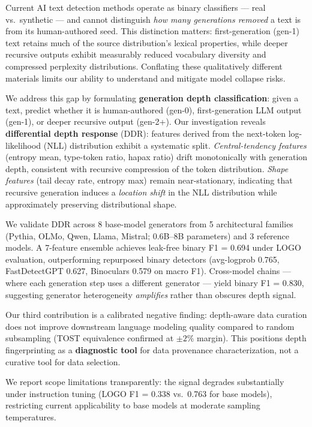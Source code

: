 \documentclass[11pt,twocolumn]{article}
\begin{document}
Current AI text detection methods operate as binary classifiers --- real vs.\ synthetic --- and cannot distinguish \emph{how many generations removed} a text is from its human-authored seed.
This distinction matters: first-generation (gen-1) text retains much of the source distribution's lexical properties, while deeper recursive outputs exhibit measurably reduced vocabulary diversity and compressed perplexity distributions.
Conflating these qualitatively different materials limits our ability to understand and mitigate model collapse risks.

We address this gap by formulating \textbf{generation depth classification}: given a text, predict whether it is human-authored (gen-0), first-generation LLM output (gen-1), or deeper recursive output (gen-2+).
Our investigation reveals \textbf{differential depth response} (DDR): features derived from the next-token log-likelihood (NLL) distribution exhibit a systematic split.
\emph{Central-tendency features} (entropy mean, type-token ratio, hapax ratio) drift monotonically with generation depth, consistent with recursive compression of the token distribution.
\emph{Shape features} (tail decay rate, entropy max) remain near-stationary, indicating that recursive generation induces a \emph{location shift} in the NLL distribution while approximately preserving distributional shape.

We validate DDR across 8 base-model generators from 5 architectural families (Pythia, OLMo, Qwen, Llama, Mistral; 0.6B--8B parameters) and 3 reference models.
A 7-feature ensemble achieves leak-free binary F1 = 0.694 under LOGO evaluation, outperforming repurposed binary detectors (avg-logprob 0.765, FastDetectGPT 0.627, Binoculars 0.579 on macro F1).
Cross-model chains --- where each generation step uses a different generator --- yield binary F1 = 0.830, suggesting generator heterogeneity \emph{amplifies} rather than obscures depth signal.

Our third contribution is a calibrated negative finding: depth-aware data curation does not improve downstream language modeling quality compared to random subsampling (TOST equivalence confirmed at $\pm 2\%$ margin).
This positions depth fingerprinting as a \textbf{diagnostic tool} for data provenance characterization, not a curative tool for data selection.

We report scope limitations transparently: the signal degrades substantially under instruction tuning (LOGO F1 = 0.338 vs.\ 0.763 for base models), restricting current applicability to base models at moderate sampling temperatures.
\end{document}
